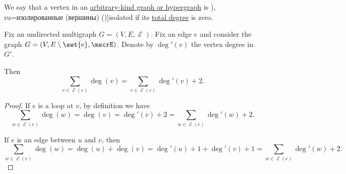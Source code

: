 \begin{definition}\label{def:isolated_vertex}
  We say that a vertex in an \hyperref[rem:arbitrary_kind_graph]{arbitrary-kind graph or hypergraph} is \term[bg=изолирани (върхове) (\cite[8]{Мирчев2001Графи}), ru=изолированные (вершины) (\cite[26]{ЕмеличевИПр1990ТеорияГрафов})]{isolated} if its \hyperref[def:graph_cardinality/directed_degree]{total degree} is zero.
\end{definition}

\begin{lemma}\label{thm:sum_of_endpoint_degrees}
  Fix an undirected multigraph \( G = (V, E, \mscrE) \). Fix an edge \( e \) and consider the graph \( G = (V, E \setminus \set{ e }, \mscrE) \). Denote by \( \deg'(v) \) the vertex degree in \( G' \).

  Then
  \begin{equation}\label{eq:thm:sum_of_endpoint_degrees}
    \sum_{v \in \mscrE(e)} \deg(v) = \sum_{v \in \mscrE(e)} \deg'(v) + 2.
  \end{equation}
\end{lemma}
\begin{proof}
  If \( e \) is a loop at \( v \), by definition we have
  \begin{equation*}
    \sum_{w \in \mscrE(e)} \deg(w) = \deg(v) = \deg'(v) + 2 = \sum_{w \in \mscrE(e)} \deg'(w) + 2.
  \end{equation*}

  If \( e \) is an edge between \( u \) and \( v \), then
  \begin{equation*}
    \sum_{w \in \mscrE(e)} \deg(w)
    =
    \deg(u) + \deg(v)
    =
    \deg'(u) + 1 + \deg'(v) + 1
    =
    \sum_{w \in \mscrE(e)} \deg'(w) + 2.
  \end{equation*}
\end{proof}

